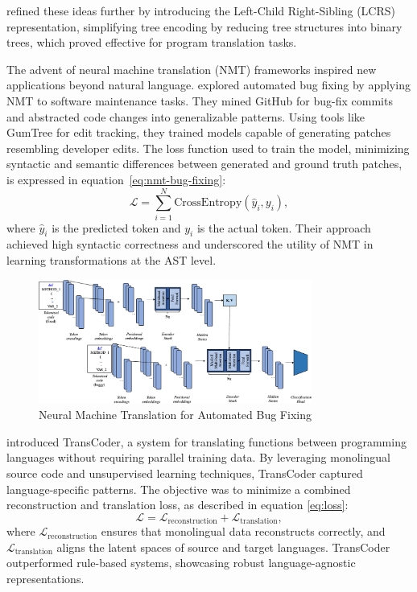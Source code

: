 \documentclass{dhbenelux}
\begin{document}
\cite{drissi2018} refined these ideas further by introducing the Left-Child Right-Sibling (LCRS) representation, simplifying tree encoding by reducing tree structures into binary trees, which proved effective for program translation tasks.


The advent of neural machine translation (NMT) frameworks inspired new applications beyond natural language. \cite{tufano2018} explored automated bug fixing by applying NMT to software maintenance tasks. They mined GitHub for bug-fix commits and abstracted code changes into generalizable patterns. Using tools like GumTree for edit tracking, they trained models capable of generating patches resembling developer edits. The loss function used to train the model, minimizing syntactic and semantic differences between generated and ground truth patches, is expressed in equation~\ref{eq:nmt-bug-fixing}:
\begin{equation}
\mathcal{L} = \sum_{i=1}^N \text{CrossEntropy}(\hat{y}_i, y_i),
\label{eq:nmt-bug-fixing}
\end{equation}
where \( \hat{y}_i \) is the predicted token and \( y_i \) is the actual token. Their approach achieved high syntactic correctness and underscored the utility of NMT in learning transformations at the AST level.
\begin{figure}[h]
    \centering
    \includegraphics[width=0.8\textwidth]{Images/3.png} %
    \caption{Neural Machine Translation for Automated Bug Fixing}
    \label{fig:nmt-bug-fixing}
\end{figure}

\cite{lachaux2020} introduced TransCoder, a system for translating functions between programming languages without requiring parallel training data. By leveraging monolingual source code and unsupervised learning techniques, TransCoder captured language-specific patterns. The objective was to minimize a combined reconstruction and translation loss, as described in equation \ref{eq:loss}:
\begin{equation}
\mathcal{L} = \mathcal{L}_{\text{reconstruction}} + \mathcal{L}_{\text{translation}},
\label{eq:loss}
\end{equation}
where \( \mathcal{L}_{\text{reconstruction}} \) ensures that monolingual data reconstructs correctly, and \( \mathcal{L}_{\text{translation}} \) aligns the latent spaces of source and target languages. TransCoder outperformed rule-based systems, showcasing robust language-agnostic representations.
\end{document}
